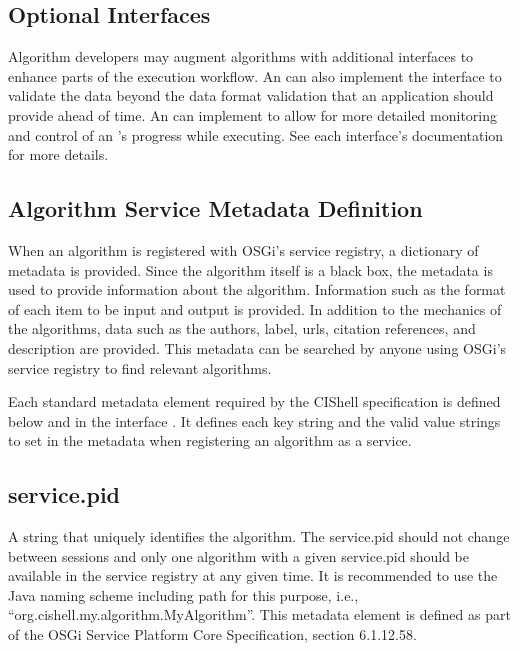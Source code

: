 \subsection{Optional Interfaces}

Algorithm developers may augment algorithms with additional interfaces to enhance
parts of the execution workflow. An  can also implement
the  interface to validate the data beyond the data format
validation that an application should provide ahead of time. An 
can implement  to allow for more detailed monitoring and
control of an 's progress while executing. See each interface's
documentation for more details.

\subsection{Algorithm Service Metadata Definition}
\label{algMetaData}

When an algorithm is registered with OSGi's service registry, a dictionary of
metadata is provided. Since the algorithm itself is a black box, the metadata is
used to provide information about the algorithm. Information such as the format
of each  item to be input and output is provided. In addition to the
mechanics of the algorithms, data such as the authors, label, urls, citation
references, and description are provided. This metadata can be searched by anyone
using OSGi's service registry to find relevant algorithms.

Each standard metadata element required by the CIShell specification is defined
below and in the interface . It defines each key string
and the valid value strings to set in the metadata  when
registering an algorithm as a service.

\subsection*{service.pid}
A string that uniquely identifies the algorithm. The service.pid should not
change between sessions and only one algorithm with a given service.pid should
be available in the service registry at any given time. It is recommended to 
use the Java naming scheme including path for this purpose, i.e.,
``org.cishell.my.algorithm.MyAlgorithm''. This metadata element is defined
as part of the OSGi Service Platform Core Specification, section 6.1.12.58. 

